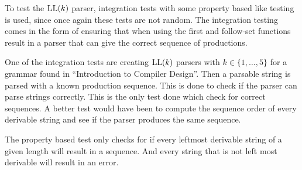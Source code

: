 To test the $\text{LL}(k)$ parser, integration tests with some property based like testing is used, since once again these tests are not random. The integration testing comes in the form of ensuring that when using the first and follow-set functions result in a parser that can give the correct sequence of productions.

One of the integration tests are creating $\text{LL}(k)$ parsers with $k \in \{1, \dots, 5\}$ for a grammar \cite[45]{Mogensen} found in ``Introduction to Compiler Design''. Then a parsable string is parsed with a known production sequence. This is done to check if the parser can parse strings correctly. This is the only test done which check for correct sequences. A better test would have been to compute the sequence order of every derivable string and see if the parser produces the same sequence.

The property based test only checks for if every leftmost derivable string of a given length will result in a sequence. And every string that is not left most derivable will result in an error. 